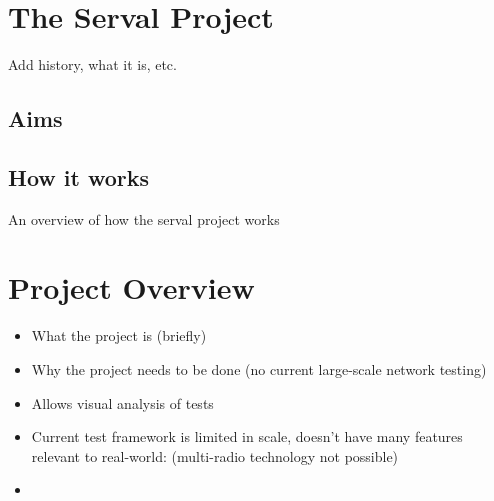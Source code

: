 
\section{The Serval Project}\label{sec:firstsection}
Add history, what it is, etc.



\subsection{Aims}



\subsection{How it works}
An overview of how the serval project works



\section{Project Overview}

\begin{itemize}
    \item What the project is (briefly)
    \item Why the project needs to be done (no current large-scale network testing)
    \item Allows visual analysis of tests 
    \item Current test framework is limited in scale, doesn't have many features relevant to real-world: (multi-radio technology not possible)
    \item 
\end{itemize}